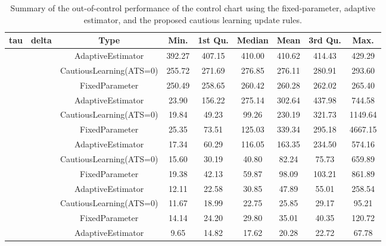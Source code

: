 \begin{table}[!h]

\caption{Summary of the out-of-control performance of the control chart using the fixed-parameter, adaptive estimator, and the proposed cautious learning update rules.}
\centering
\begin{tabular}[t]{ccccccccc}
\toprule
tau & delta & Type & Min. & 1st Qu. & Median & Mean & 3rd Qu. & Max.\\
\midrule
 &  & AdaptiveEstimator & 392.27 & 407.15 & 410.00 & 410.62 & 414.43 & 429.29\\

 &  & CautiousLearning(ATS=0) & 255.72 & 271.69 & 276.85 & 276.11 & 280.91 & 293.60\\

 & \multirow[t]{-3}{*}{\centering\arraybackslash 0.25} & FixedParameter & 250.49 & 258.65 & 260.42 & 260.28 & 262.02 & 265.40\\
\cmidrule{2-9}
 &  & AdaptiveEstimator & 23.90 & 156.22 & 275.14 & 302.64 & 437.98 & 744.58\\

 &  & CautiousLearning(ATS=0) & 19.84 & 49.23 & 99.26 & 230.19 & 321.73 & 1149.64\\

 & \multirow[t]{-3}{*}{\centering\arraybackslash 0.35} & FixedParameter & 25.35 & 73.51 & 125.03 & 339.34 & 295.18 & 4667.15\\
\cmidrule{2-9}
 &  & AdaptiveEstimator & 17.34 & 60.29 & 116.05 & 163.35 & 234.50 & 574.16\\

 &  & CautiousLearning(ATS=0) & 15.60 & 30.19 & 40.80 & 82.24 & 75.73 & 659.89\\

 & \multirow[t]{-3}{*}{\centering\arraybackslash 0.50} & FixedParameter & 19.38 & 42.13 & 59.87 & 98.09 & 103.21 & 861.89\\
\cmidrule{2-9}
 &  & AdaptiveEstimator & 12.11 & 22.58 & 30.85 & 47.89 & 55.01 & 258.54\\

 &  & CautiousLearning(ATS=0) & 11.67 & 18.99 & 22.75 & 25.85 & 29.17 & 95.21\\

 & \multirow[t]{-3}{*}{\centering\arraybackslash 0.75} & FixedParameter & 14.14 & 24.20 & 29.80 & 35.01 & 40.35 & 120.72\\
\cmidrule{2-9}
 &  & AdaptiveEstimator & 9.65 & 14.82 & 17.62 & 20.28 & 22.72 & 67.78\\


\end{tabular}
\end{table}
